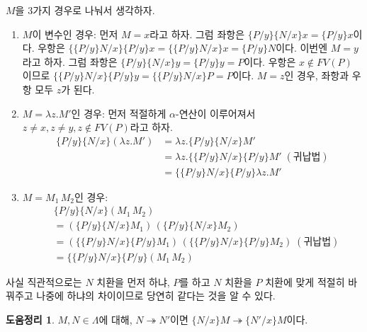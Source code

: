 \documentclass[b5paper, 11pt]{book}
\theoremstyle{definition}
\newtheorem{lem}[defn]{도움정리}
\newenvironment{pf*}{\pushQED{\qed}\pf}
{\popQED\endpf}
\begin{document}
\begin{pf*}
    $M$을 3가지 경우로 나눠서 생각하자.
    \begin{enumerate}
        \item $M$이 변수인 경우: 
        먼저 $M = x$라고 하자. 그럼 좌항은 $\{P / y\} \{ N / x\} x = \{ P / y\} x$이다. 우항은 $\{ \{P / y\} N / x \} \{P / y\} x = \{ \{P / y\} N / x \} x = \{P / y\} N$이다. 이번엔 $M = y$라고 하자. 그럼 좌항은 $\{P / y\} \{ N / x\} y = \{ P / y\} y = P$이다. 우항은 $x \notin FV(P)$ 이므로 $\{ \{P / y\} N / x \} \{P / y\}  y = \{ \{P / y\} N / x \} P = P $이다. $M= z$인 경우, 좌항과 우항 모두 $z$가 된다.
        \item $M = \lambda z. M'$인 경우: 먼저 적절하게 $\alpha$-연산이 이루어져서 $z \neq x, z \neq y, z \notin FV(P)$라고 하자.  
        \begin{align*}
            \{P / y\} \{ N / x\} (\lambda z. M') &= \lambda z. \{P / y\} \{ N / x\}  M' \\ 
            &=  \lambda z. \{ \{P / y\} N / x \} \{P / y \}  M' \; (\text{귀납법})\\ 
            &=   \{ \{P / y\} N / x \} \{P / y \}  \lambda z. M' 
        \end{align*}
        \item $M = M_1 \, M_2$인 경우:
        \begin{align*}
            &\{P / y\} \{ N / x\} (M_1 \, M_2) \\ 
            & = (\{P / y\} \{ N / x\} M_1 ) \, 
            ( \{P / y\} \{ N / x\} M_2) \\
            &= (\{ \{P / y\} N / x \} \{P / y \} M_1) \, 
            (\{ \{P / y\} N / x \} \{P / y \} M_2) \; (\text{귀납법}) \\
            &= \{ \{P / y\} N / x \} \{P / y \} (M_1 \, M_2)
        \end{align*}
    \end{enumerate}
\end{pf*}
사실 직관적으로는 $N$ 치환을 먼저 하냐, $P$를 하고 $N$ 치환을 $P$ 치환에 맞게 적절히 바꿔주고 나중에 하냐의 차이이므로 당연히 같다는 것을 알 수 있다.
\begin{lem}\label{lem3}
    $M, N \in \Lambda$에 대해, $N \twoheadrightarrow N'$이면 $\{N / x\}M \twoheadrightarrow \{N' / x\}M$이다.
\end{lem}
\end{document}
